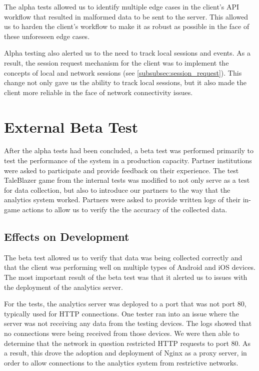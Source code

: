 The alpha tests allowed us to identify multiple edge cases in the client's API workflow that resulted in malformed data to be sent to the server. This allowed us to harden the client's workflow to make it as robust as possible in the face of these unforeseen edge cases. 

Alpha testing also alerted us to the need to track local sessions and events. As a result, the session request mechanism for the client was to implement the concepts of local and network sessions (see \ref{subsubsec:session_request}). This change not only gave us the ability to track local sessions, but it also made the client more reliable in the face of network connectivity issues. 

\section{External Beta Test}

After the alpha tests had been concluded, a beta test was performed primarily to test the performance of the system in a production capacity. Partner institutions were asked to participate and provide feedback on their experience. The test TaleBlazer game from the internal tests was modified to not only serve as a test for data collection, but also to introduce our partners to the way that the analytics system worked. Partners were asked to provide written logs of their in-game actions to allow us to verify the the accuracy of the collected data.

\subsection{Effects on Development}

The beta test allowed us to verify that data was being collected correctly and that the client was performing well on multiple types of Android and iOS devices. The most important result of the beta test was that it alerted us to issues with the deployment of the analytics server.

For the tests, the analytics server was deployed to a port that was not port 80, typically used for HTTP connections. One tester ran into an issue where the server was not receiving any data from the testing devices. The logs showed that no connections were being received from those devices. We were then able to determine that the network in question restricted HTTP requests to port 80. As a result, this drove the adoption and deployment of Nginx as a proxy server, in order to allow connections to the analytics system from restrictive networks.









